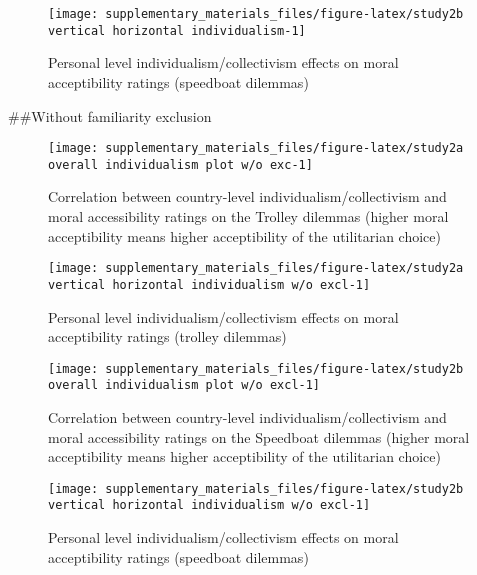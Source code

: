 \documentclass[
]{article}
\begin{document}
\begin{figure}
\texttt{[image: supplementary\_materials\_files/figure-latex/study2b vertical horizontal individualism-1]} \caption{Personal level individualism/collectivism effects on moral acceptibility ratings (speedboat dilemmas)}\label{fig:study2b vertical horizontal individualism}
\end{figure}

\#\#Without familiarity exclusion

\begin{figure}[H]
\texttt{[image: supplementary\_materials\_files/figure-latex/study2a overall individualism plot w/o exc-1]} \caption{Correlation between country-level individualism/collectivism and moral accessibility ratings on the Trolley dilemmas (higher moral acceptibility means higher acceptibility of the utilitarian choice)}\label{fig:study2a overall individualism plot w/o exc}
\end{figure}

\begin{figure}
\texttt{[image: supplementary\_materials\_files/figure-latex/study2a vertical horizontal individualism w/o excl-1]} \caption{Personal level individualism/collectivism effects on moral acceptibility ratings (trolley dilemmas)}\label{fig:study2a vertical horizontal individualism w/o excl}
\end{figure}

\begin{figure}[H]
\texttt{[image: supplementary\_materials\_files/figure-latex/study2b overall individualism plot w/o excl-1]} \caption{Correlation between country-level individualism/collectivism and moral accessibility ratings on the Speedboat dilemmas (higher moral acceptibility means higher acceptibility of the utilitarian choice)}\label{fig:study2b overall individualism plot w/o excl}
\end{figure}

\begin{figure}
\texttt{[image: supplementary\_materials\_files/figure-latex/study2b vertical horizontal individualism w/o excl-1]} \caption{Personal level individualism/collectivism effects on moral acceptibility ratings (speedboat dilemmas)}\label{fig:study2b vertical horizontal individualism w/o excl}
\end{figure}
\end{document}
